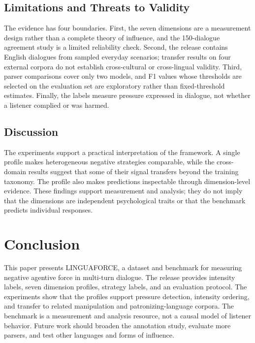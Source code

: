 \documentclass[conference]{IEEEtran}
\begin{document}
\subsection{Limitations and Threats to Validity}
The evidence has four boundaries. First, the seven dimensions are a measurement
design rather than a complete theory of influence, and the 150-dialogue
agreement study is a limited reliability check. Second, the release contains
English dialogues from sampled everyday scenarios; transfer results on four
external corpora do not establish cross-cultural or cross-lingual validity.
Third, parser comparisons cover only two models, and F1 values whose thresholds
are selected on the evaluation set are exploratory rather than fixed-threshold
estimates. Finally, the labels measure pressure expressed in dialogue, not
whether a listener complied or was harmed.


\subsection{Discussion}
The experiments support a practical interpretation of the framework. A single
profile makes heterogeneous negative strategies comparable, while the
cross-domain results suggest that some of their signal transfers beyond the
training taxonomy. The profile also makes predictions inspectable through
dimension-level evidence. These findings support measurement and analysis;
they do not imply that the dimensions are independent psychological traits or
that the benchmark predicts individual responses.


\section{Conclusion}
This paper presents LINGUAFORCE, a dataset and benchmark for measuring negative
agentive force in multi-turn dialogue. The release provides intensity labels,
seven dimension profiles, strategy labels, and an evaluation protocol. The
experiments show that the profiles support pressure detection, intensity
ordering, and transfer to related manipulation and patronizing-language
corpora. The benchmark is a measurement and analysis resource, not a causal
model of listener behavior. Future work should broaden the annotation study,
evaluate more parsers, and test other languages and forms of influence.

\appendices
\end{document}

